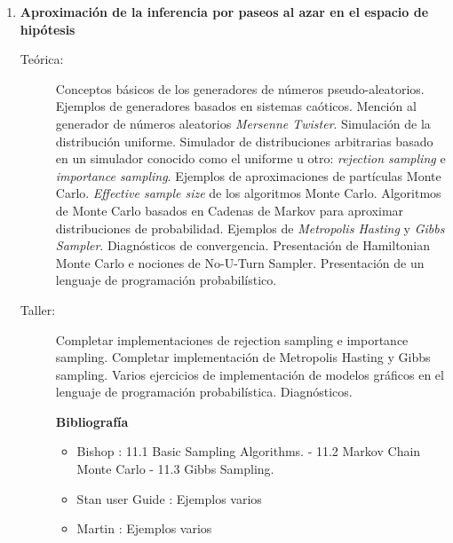 \documentclass[11pt]{article}
\begin{document}
\begin{enumerate}
\item \textbf{Aproximación de la inferencia por paseos al azar en el espacio de hipótesis}
\vspace{-0.15cm}
\begin{description}
\item[Teórica:] Conceptos básicos de los generadores de números pseudo-aleatorios. Ejemplos de generadores basados en sistemas caóticos. Mención al generador de números aleatorios \emph{Mersenne Twister}. Simulación de la distribución uniforme. Simulador de distribuciones arbitrarias basado en un simulador conocido como el uniforme u otro: \emph{rejection sampling} e \emph{importance sampling}.
Ejemplos de aproximaciones de partículas Monte Carlo. \emph{Effective sample size} de los algoritmos Monte Carlo. Algoritmos de Monte Carlo basados en Cadenas de Markov para aproximar distribuciones de probabilidad. Ejemplos de \emph{Metropolis Hasting} y \emph{Gibbs Sampler}. Diagnósticos de convergencia.
Presentación de Hamiltonian Monte Carlo e nociones de No-U-Turn Sampler.
Presentación de un lenguaje de programación probabilístico.
\item[Taller:] Completar implementaciones de rejection sampling e importance sampling.
Completar implementación de Metropolis Hasting y Gibbs sampling.
Varios ejercicios de implementación de modelos gráficos en el lenguaje de programación probabilística.
Diagnósticos.
\item[] \textbf{Bibliografía}
\begin{itemize}
\item Bishop \cite{bishop2006-PRML}: 11.1 Basic Sampling Algorithms. - 11.2 Markov Chain Monte Carlo - 11.3 Gibbs Sampling.
\item Stan user Guide \cite{stan-userGuide}: Ejemplos varios
\item Martin \cite{martin2022-BMCP}: Ejemplos varios
\end{itemize}
\end{description}


\end{enumerate}
\end{document}
